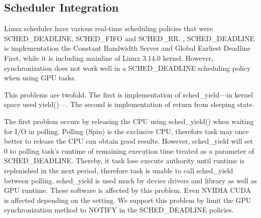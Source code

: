 \subsection{Scheduler Integration}
Linux scheduler have various real-time scheduling policies that were SCHED\_DEADLINE, SCHED\_FIFO and SCHED\_RR.
, SCHED\_DEADLINE is implementation the Constant Bandwidth Server and Global Earliest Deadline First,
while it is including mainline of Linux 3.14.0 kernel.
However, synchronization does not work well in a SCHED\_DEADLINE scheduling policy when using GPU tasks.

This problems are twofold.
The first is implementation of sched\_yield---in kernel space used yield()---.
The second is implementation of return from sleeping state.


The first problem occurs by releasing the CPU using sched\_yield() when waiting for I/O in polling.
Polling (Spin) is the exclusive CPU, therefore task may once better to release the CPU can obtain good results.
However, sched\_yield will set 0 to polling task's runtime of remaining execution time treated as a parameter of SCHED\_DEADLINE.
Thereby, it task lose execute authority until runtime is replenished in the next period, therefore task is unable to call sched\_yield between polling.
sched\_yield is used much by device drivers and library as well as GPU runtime.
These software is affected by this problem.
Even NVIDIA CUDA is affected depending on the setting.
We support this problem by limit the GPU synchronization method to NOTIFY  in the SCHED\_DEADLINE policies.

